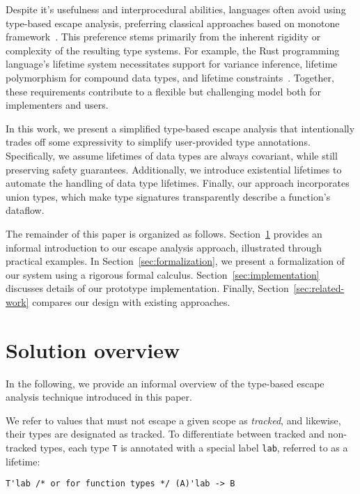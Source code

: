 \documentclass[11pt]{article}
\begin{document}

    Despite it's usefulness and interprocedural abilities, languages often avoid using type-based escape analysis, preferring classical approaches based on monotone framework~\cite{blanchet1999escape}. %
    This preference stems primarily from the inherent rigidity or complexity of the resulting type systems.
    For example, the Rust programming language’s lifetime system necessitates support for variance inference, lifetime polymorphism for compound data types, and lifetime constraints~\cite{matsakis2014rust}.
    Together, these requirements contribute to a flexible but challenging model both for implementers and users.

    In this work, we present a simplified type-based escape analysis that intentionally trades off some expressivity to simplify user-provided type annotations.
    Specifically, we assume lifetimes of data types are always covariant, while still preserving safety guarantees.
    Additionally, we introduce existential lifetimes to automate the handling of data type lifetimes.
    Finally, our approach incorporates union types, which make type signatures transparently describe a function's dataflow.

    The remainder of this paper is organized as follows.
    Section~\ref{sec:overview} provides an informal introduction to our escape analysis approach, illustrated through practical examples.
    In Section~\ref{sec:formalization}, we present a formalization of our system using a rigorous formal calculus.
    Section~\ref{sec:implementation} discusses details of our prototype implementation.
    Finally, Section~\ref{sec:related-work} compares our design with existing approaches.


    \section{Solution overview} \label{sec:overview}

    In the following, we provide an informal overview of the type-based escape analysis technique introduced in this paper.

    We refer to values that must not escape a given scope as \textit{tracked}, and likewise, their types are designated as tracked.
    To differentiate between tracked and non-tracked types, each type \lstinline[language=colang]|T| is annotated with a special label \lstinline[language=colang]|lab|, referred to as a lifetime:
    \begin{lstlisting}[language=colang]
        T'lab /* or for function types */ (A)'lab -> B
    \end{lstlisting}
\end{document}
